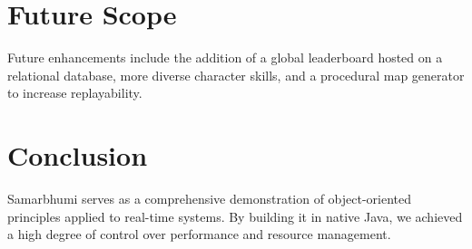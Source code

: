 \documentclass[a4paper,12pt]{article}
\begin{document}
\section{Future Scope}
Future enhancements include the addition of a global leaderboard hosted on a relational database, more diverse character skills, and a procedural map generator to increase replayability.

\section{Conclusion}
Samarbhumi serves as a comprehensive demonstration of object-oriented principles applied to real-time systems. By building it in native Java, we achieved a high degree of control over performance and resource management.
\end{document}
